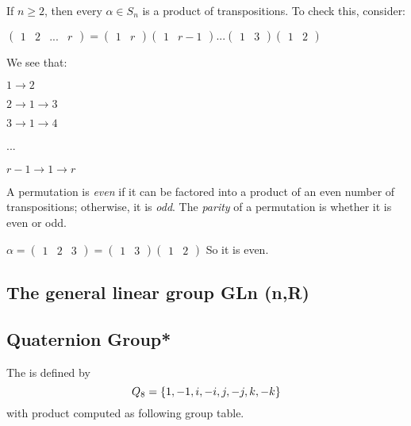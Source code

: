 \begin{note}
	If $n \geq 2$, then every $\alpha \in S_n$ is a product of transpositions.  To check this, consider:
	
	$\left( \begin{matrix}
	1&2&...&r
	\end{matrix} \right) =
	\left( \begin{matrix}
	1&r
	\end{matrix} \right)
	\left( \begin{matrix}
	1&r-1
	\end{matrix} \right)
	...
	\left( \begin{matrix}
	1&3
	\end{matrix} \right)
	\left( \begin{matrix}
	1&2
	\end{matrix} \right)$
\end{note}

We see that:

$1 \rightarrow 2$

$2 \rightarrow 1 \rightarrow 3$

$3 \rightarrow 1 \rightarrow 4$

...

$r-1 \rightarrow 1 \rightarrow r$

\begin{defn}
	A permutation is \emph{even} if it can be factored into a product of an even number of transpositions; otherwise, it is \emph{odd}.  The \emph{parity} of a permutation is whether it is even or odd.
\end{defn}

\begin{ex}
	$\alpha =
	\left( \begin{matrix}
	1&2&3
	\end{matrix} \right) =
	\left( \begin{matrix}
	1&3
	\end{matrix} \right)
	\left( \begin{matrix}
	1&2
	\end{matrix} \right)$
	So it is even.
\end{ex}
\subsection{The general linear group GLn (n,R)}
\subsection{Quaternion Group*}
The  is defined by
\[Q_8 =\left\{1,-1,i,-i,j,-j,k,-k\right\} \] 
with product computed as following group table.

